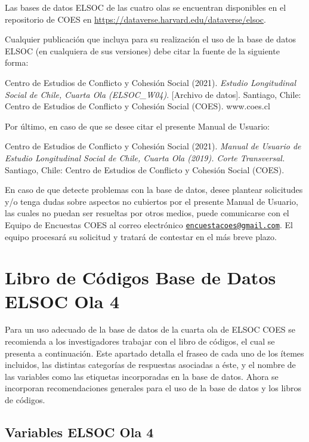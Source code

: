 \documentclass[
]{book}
\begin{document}
Las bases de datos ELSOC de las cuatro olas se encuentran disponibles en el repositorio de COES en \url{https://dataverse.harvard.edu/dataverse/elsoc}.

Cualquier publicación que incluya para su realización el uso de la base de datos ELSOC (en cualquiera de sus versiones) debe citar la fuente de la siguiente forma:

Centro de Estudios de Conflicto y Cohesión Social (2021). \emph{Estudio Longitudinal Social de Chile, Cuarta Ola (ELSOC\_W04)}. {[}Archivo de datos{]}. Santiago, Chile: Centro de Estudios de Conflicto y Cohesión Social (COES). www.coes.cl

Por último, en caso de que se desee citar el presente Manual de Usuario:

Centro de Estudios de Conflicto y Cohesión Social (2021). \emph{Manual de Usuario de Estudio Longitudinal Social de Chile, Cuarta Ola (2019). Corte Transversal.} Santiago, Chile: Centro de Estudios de Conflicto y Cohesión Social (COES).

En caso de que detecte problemas con la base de datos, desee plantear solicitudes y/o tenga dudas sobre aspectos no cubiertos por el presente Manual de Usuario, las cuales no puedan ser resueltas por otros medios, puede comunicarse con el Equipo de Encuestas COES al correo electrónico \href{mailto:encuestacoes@gmail.com}{\nolinkurl{encuestacoes@gmail.com}}. El equipo procesará su solicitud y tratará de contestar en el más breve plazo.

\hypertarget{libro-de-cuxf3digos-base-de-datos-elsoc-ola-4}{%
\chapter{Libro de Códigos Base de Datos ELSOC Ola 4}\label{libro-de-cuxf3digos-base-de-datos-elsoc-ola-4}}

Para un uso adecuado de la base de datos de la cuarta ola de ELSOC COES se recomienda a los investigadores trabajar con el libro de códigos, el cual se presenta a continuación. Este apartado detalla el fraseo de cada uno de los ítemes incluidos, las distintas categorías de respuestas asociadas a éste, y el nombre de las variables como las etiquetas incorporadas en la base de datos. Ahora se incorporan recomendaciones generales para el uso de la base de datos y los libros de códigos.

\hypertarget{variables-elsoc-ola-4}{%
\section{Variables ELSOC Ola 4}\label{variables-elsoc-ola-4}}
\end{document}
